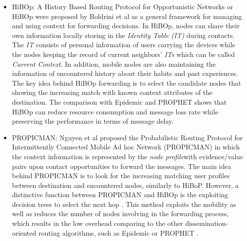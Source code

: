 	\begin{itemize}
		\item HiBOp:
		A History Based Routing Protocol for Opportunistic Networks or HiBOp were proposed by Boldrini et al \cite{Boldrini2007} as a general framework for managing and using context for forwarding decisions.
		In HiBOp, nodes can share their own information locally storing in the \emph{Identity Table (IT)} during contacts.
		The \textit{IT} consists of personal information of users carrying the devices while the nodes keeping the record of current neighbors' \textit{ITs} which can be called \emph{Current Context}.
		In addition, mobile nodes are also maintaining the information of encountered history about their habits and past experiences.
		The key idea behind HiBOp forwarding is to select the candidate nodes that showing the increasing match with known context attributes of the destination.
		The comparison with Epidemic and PROPHET shows that HiBOp can reduce resource consumption and message loss rate while preserving the performance in terms of message delay.

		\item PROPICMAN:
		Nguyen et al \cite{Nguyen2007} proposed the Probabilistic Routing Protocol for Intermittently Connected Mobile Ad hoc Network (PROPICMAN) in which the context information is represented by the \emph{node profile}with evidence/value pairs upon contact opportunities to forward the messages. 
		The main idea behind PROPICMAN is to look for the increasing matching user profiles between destination and encountered nodes, similarly to HiBoP.
		However, a distinctive function between PROPICMAN and HiBOp is the exploiting decision trees to select the next hop \cite{Conti2010}.
		This method exploits the mobility as well as reduces the number of nodes involving in the forwarding process, which results in the low overhead comparing to the other dissemination-oriented routing algorithms, such as Epidemic or PROPHET \cite{isaac2013}. 


\end{itemize}
